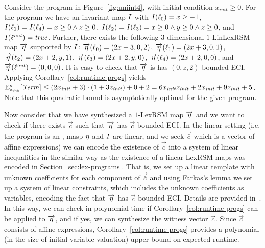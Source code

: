 \begin{example}
Consider the program in Figure~\ref{fig:uniint4}, with initial condition 
$x_{\mathit{init}}\geq 0$. For the program we have an 
invariant map $I$ with $I(\ell_0)=x\geq -1$, $I(\ell_1)=I(\ell_4) = 
x\geq 0 
\wedge z\geq 0$, $I(\ell_2)=I(\ell_3)= x\geq 0 \wedge y \geq 0
\wedge z\geq 0$, and $I(\ell^{\mathit{out}})=\mathit{true}$. Further, there exists 
the following 
$3$-dimensional 
$1$-LinLexRSM map $\overrightarrow{\eta}$ supported by $I$: 
$\overrightarrow{\eta}(\ell_0)=(2x+3,0,2)$, 
$\overrightarrow{\eta}(\ell_1)=(2x+3,0,1)$, 
$\overrightarrow{\eta}(\ell_2)=(2x+2,y,1)$, 
$\overrightarrow{\eta}(\ell_3)=(2x+2,y,0)$, 
$\overrightarrow{\eta}(\ell_4)=(2x+2,0,0)$, and 
$\overrightarrow{\eta}(\ell^{\mathit{out}})=(0,0,0)$. It is 
easy to check that $\overrightarrow{\eta}$ is has $(0,z,2)$-bounded ECI. 
Applying 
Corollary~\ref{col:runtime-progs} yields $\mathbb{E}^{\sigma}_{\mathbf{x}_{\mathit{init}}}[\mathit{Term}]\leq 
(2x_{\mathit{init}} + 
3)\cdot(1+3z_{\mathit{init}})+0+2= 6x_{\mathit{init}}z_{\mathit{init}} + 
2x_{\mathit{init}} + 9z_{\mathit{init}}+5$. Note that this quadratic bound is 
asymptotically optimal for the given program.
\end{example}

\begin{remark}\label{rem:poly}
Now consider that we have synthesized a $1$-LexRSM map $\overrightarrow{\eta}$ 
and we want 
to check if there exists $\bar{\vec{c}}$ such that $\overrightarrow{\eta}$ has 
$\bar{\vec{c}}$-bounded ECI. In the linear setting (i.e. the program is an 
\APP{}, masp $\eta$ and $I$ are linear, and we seek $\vec{\bar{c}}$ which is 
a vector of affine expressions) we can encode the existence of $\vec{\bar{c}}$ 
into a system of linear inequalities in the similar way as the existence of a 
linear LexRSM maps was encoded in Section~\ref{sec:lex-programs}. That is, we 
set up a linear template with unknown coefficients for each component of 
$\vec{\bar{c}}$ and using Farkas's lemma we set up a system of linear 
constraints, which includes the unknown coefficients as variables, encoding the 
fact that $\overrightarrow{\eta}$ has $\bar{\vec{c}}$-bounded ECI. Details are 
provided 
in~\AppendixMaterial. In this way, we can check in polynomial time if 
Corollary~\ref{col:runtime-progs} can be applied to $\overrightarrow{\eta}$, 
and if yes, 
we can synthesize the witness vector $\bar{\vec{c}}$. Since $\bar{\vec{c}}$ 
consists of affine expressions, Corollary~\ref{col:runtime-progs} provides a 
polynomial (in the size of 
initial variable valuation) upper bound on expected runtime.
\end{remark}


